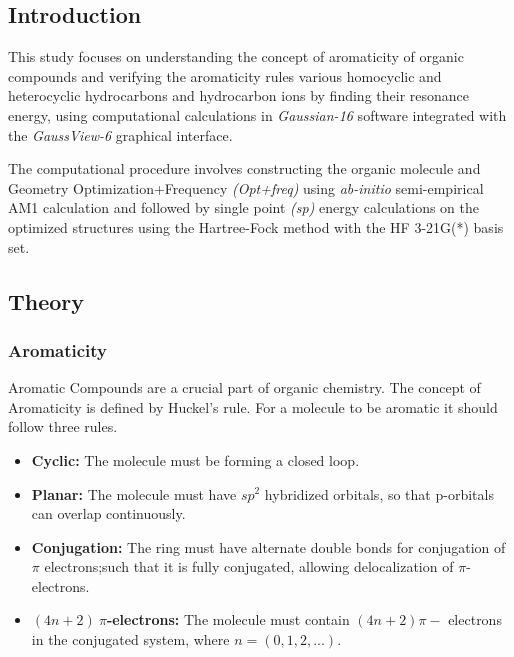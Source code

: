 \newpage
\subsection{Introduction}
This study focuses on understanding the concept of aromaticity of organic compounds and verifying the aromaticity rules various homocyclic and heterocyclic hydrocarbons and hydrocarbon ions by finding their resonance energy, using computational calculations in \textit{Gaussian-16} software integrated with the \textit{GaussView-6} graphical interface.

The computational procedure involves constructing the organic molecule and Geometry Optimization+Frequency \textit{ (Opt+freq)} using \textit{ab-initio }semi-empirical AM1 calculation and followed by single point \textit{(sp)} energy calculations on the optimized structures using the Hartree-Fock method with the HF 3-21G(*) basis set.



\subsection{Theory}
\subsubsection{Aromaticity}
Aromatic Compounds are a crucial part of organic chemistry. The concept of Aromaticity is defined by Huckel's rule. For a molecule to be aromatic it should follow three rules.
\begin{itemize}[label=] 
    \item \textbf{Cyclic:} The molecule must be forming a closed loop.
    \item \textbf{Planar:} The molecule must have $sp^2$ hybridized orbitals, so that p-orbitals can overlap continuously.
    \item \textbf{Conjugation:} The ring must have alternate double bonds for conjugation of $\pi$ electrons;such that it is fully conjugated, allowing delocalization of $\pi$-electrons.
    \item \textbf{\boldmath$(4n + 2)\ \pi$-electrons:} The molecule must contain $(4n + 2) \pi-$ electrons in the conjugated system, where $n = (0, 1, 2,...).$
\end{itemize}



